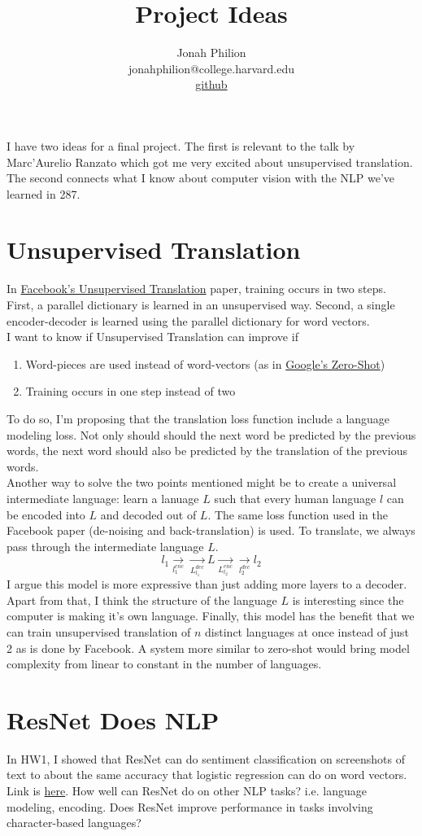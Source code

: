 \documentclass[11pt]{article}
\title{Project Ideas}
\author{Jonah Philion \\ jonahphilion@college.harvard.edu \\ \href{https://github.com/jonahthelion/cs287-s18/tree/master/HW2}{github}}
\begin{document}
\maketitle{}

I have two ideas for a final project. The first is relevant to the talk by Marc'Aurelio Ranzato which got me very excited about unsupervised translation. The second connects what I know about computer vision with the NLP we've learned in 287.

\section{Unsupervised Translation}
In \href{https://arxiv.org/pdf/1711.00043.pdf}{Facebook's Unsupervised Translation} paper, training occurs in two steps. First, a parallel dictionary is learned in an unsupervised way. Second, a single encoder-decoder is learned using the parallel dictionary for word vectors.\\
I want to know if Unsupervised Translation can improve if
\begin{enumerate}
 \item Word-pieces are used instead of word-vectors (as in \href{https://arxiv.org/pdf/1611.04558.pdf}{Google's Zero-Shot})
 \item Training occurs in one step instead of two
\end{enumerate}
To do so, I'm proposing that the translation loss function include a language modeling loss. Not only should should the next word be predicted by the previous words, the next word should also be predicted by the translation of the previous words.\\ 
Another way to solve the two points mentioned might be to create a universal intermediate language: learn a lanuage $L$ such that every human language $l$ can be encoded into $L$ and decoded out of $L$. The same loss function used in the Facebook paper (de-noising and back-translation) is used. To translate, we always pass through the intermediate language $L$.
$$ l_1 \xrightarrow[l_1^{enc}]{} \xrightarrow[L_{l_1}^{dec}]{} L \xrightarrow[L_{l_2}^{enc}]{} \xrightarrow[l_{2}^{dec}]{} l_2 $$
I argue this model is more expressive than just adding more layers to a decoder. Apart from that, I think the structure of the language $L$ is interesting since the computer is making it's own language. Finally, this model has the benefit that we can train unsupervised translation of $n$ distinct languages at once instead of just 2 as is done by Facebook. A system more similar to zero-shot would bring model complexity from linear to constant in the number of languages.

\section{ResNet Does NLP}
In HW1, I showed that ResNet can do sentiment classification on screenshots of text to about the same accuracy that logistic regression can do on word vectors. Link is \href{https://github.com/jonahthelion/cs287-s18/blob/master/HW1/writeup/writeup.pdf}{here}. How well can ResNet do on other NLP tasks? i.e. language modeling, encoding. Does ResNet improve performance in tasks involving character-based languages?
\end{document}

